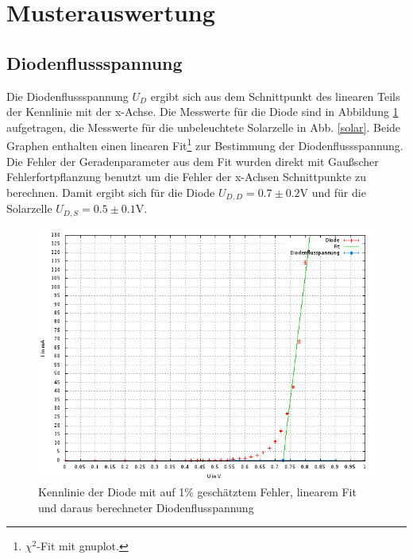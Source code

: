\section{Musterauswertung}

\subsection*{Diodenflussspannung}
Die Diodenflussspannung $U_{D}$ ergibt sich aus dem Schnittpunkt des linearen Teils der Kennlinie mit der x-Achse. Die Messwerte für die Diode sind in Abbildung \ref{diode} aufgetragen, die Messwerte für die unbeleuchtete Solarzelle in Abb. \ref{solar}. Beide Graphen enthalten einen linearen Fit\footnote{$\chi^{2}$-Fit mit gnuplot.} zur Bestimmung der Diodenflussspannung. Die Fehler der Geradenparameter aus dem Fit wurden direkt mit Gaußscher Fehlerfortpflanzung benutzt um die Fehler der x-Achsen Schnittpunkte zu berechnen. Damit ergibt sich für die Diode $U_{D,D}=0.7\pm 0.2$\;V und für die Solarzelle $U_{D,S}=0.5\pm 0.1$\;V.
\begin{figure}
\includegraphics[scale=0.6]{Auswertung/Diode.png}
\caption{Kennlinie der Diode mit auf 1\% geschätztem Fehler, linearem Fit und daraus berechneter Diodenflusspannung}
\label{diode}
\end{figure}
